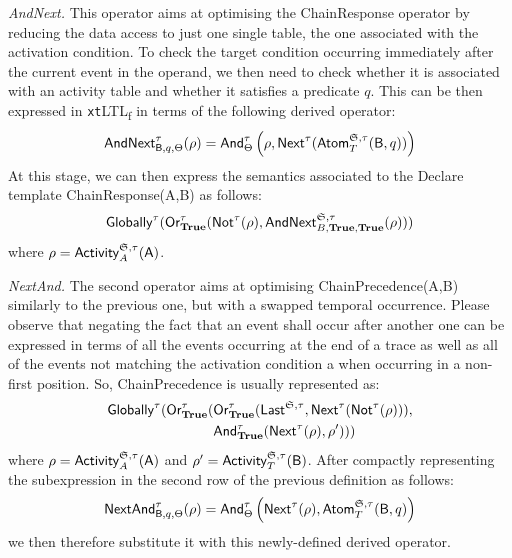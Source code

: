 \documentclass[sigconf]{acmart}
\begin{document}
\textit{AndNext.} This operator aims at optimising the \textsf{ChainResponse} operator by reducing the data access to just one single table, the one associated with the activation condition. To check the target condition occurring immediately after the current event in the operand, we then need to check whether it is associated with an activity table and whether it satisfies a predicate $q$. This can be then expressed in \texttt{xt}LTL\textsubscript{f} in terms of the following derived operator:
\begin{equation}\label{eq:andNext}
\textsf{AndNext}^\tau_{\textsf{B},q,\Theta}(\rho)=\textsf{And}^\tau_\Theta\left(\rho,\textsf{Next}^\tau(\textsf{Atom}^{\mathfrak{S},\tau}_{T}(\textsf{B},q))\right)
\end{equation}
At this stage, we can then express the semantics associated to the Declare template \textsf{ChainResponse(A,B)} as follows:
\[\textsf{Globally}^\tau(\textsf{Or}^\tau_\textbf{True}(\textsf{Not}^\tau(\rho),\textsf{AndNext}^{\mathfrak{S},\tau}_{B,\textbf{True},\textbf{True}}(\rho)))\]
where $\rho=\textsf{Activity}^{\mathfrak{S},\tau}_A(\textsf{A})$.
\medskip


\textit{NextAnd.} The second operator aims at optimising \textsf{ChainPrecedence(A,B)} similarly to the previous one, but with a swapped temporal occurrence. Please observe that negating the fact that an event shall occur after another one can be expressed in terms of all the events occurring at the end of a trace as well as all of the events not matching the activation condition a when occurring in a non-first position. So, ChainPrecedence is usually represented as:
\[\begin{split}
\textsf{Globally}^\tau(\textsf{Or}^\tau_\textbf{True}(&\textsf{Or}^\tau_\textbf{True}(\textsf{Last}^{\mathfrak{S},\tau},\textsf{Next}^\tau(\textsf{Not}^\tau(\rho))), \\
&\textsf{And}^\tau_\textbf{True}(\textsf{Next}^\tau(\rho),\rho')))
\end{split}\]
where $\rho=\textsf{Activity}^{\mathfrak{S},\tau}_A(\textsf{A})$ and $\rho'=\textsf{Activity}^{\mathfrak{S},\tau}_T(\textsf{B})$. After compactly representing the subexpression in the second row of the previous definition as follows:
\begin{equation}\label{lastEQ}
\textsf{NextAnd}^\tau_{\textsf{B},q,\Theta}(\rho)=\textsf{And}^\tau_\Theta\left(\textsf{Next}^\tau(\rho),\textsf{Atom}^{\mathfrak{S},\tau}_{T}(\textsf{B},q)\right)
\end{equation}
 we then therefore substitute it with this newly-defined derived operator.\medskip
\end{document}
